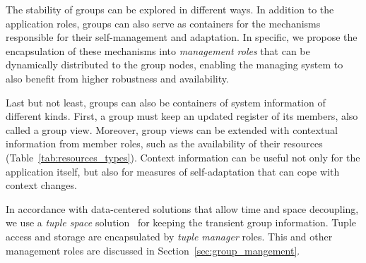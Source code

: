 


The stability of groups can be explored in different ways. In addition to the application roles, groups can also serve as containers for the mechanisms responsible for their self-management and adaptation. In specific, we propose the encapsulation of these mechanisms into \textit{management roles} that can be dynamically distributed to the group nodes, enabling the managing system to also benefit from higher robustness and availability.

Last but not least, groups can also be containers of system information of different kinds. First, a group must keep an updated register of its members, also called a group view. Moreover, group views can be extended with contextual information from member roles, such as the availability of their resources (Table~\ref{tab:resources_types}). Context information can be useful not only for the application itself, but also for measures of self-adaptation that can cope with context changes. 

In accordance with data-centered solutions that allow time and space decoupling, we use a  \textit{tuple space} solution~\cite{Murphy:2006} for keeping the transient group information. %
Tuple access and storage are encapsulated by \textit{tuple manager} roles. This and other management roles are discussed in Section~\ref{sec:group_mangement}.


